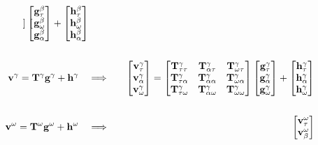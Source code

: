 \begin{equation}
\begin{aligned}
\begin{bmatrix}
    \end{bmatrix}
    \begin{bmatrix}
        \mathbf g^{\beta}_{\tau} \\
        \mathbf g^{\beta}_{\omega} \\
        \mathbf g^{\beta}_{\alpha} \\
    \end{bmatrix} + 
    \begin{bmatrix}
        \mathbf h^{\beta}_{\tau} \\
        \mathbf h^{\beta}_{\omega} \\
        \mathbf h^{\beta}_{\alpha}
    \end{bmatrix}\\
&& \\
\mathbf v^{\gamma} = \mathbf T^{\gamma} \mathbf g^{\gamma} + \mathbf h^{\gamma} \quad & \Longrightarrow  & \quad
    \begin{bmatrix}
        \mathbf v^{\gamma}_{\tau} \\
        \mathbf v^{\gamma}_{\alpha} \\
        \mathbf v^{\gamma}_{\omega} \\
    \end{bmatrix}
    =
    \begin{bmatrix}
        \mathbf T^{\gamma}_{\tau\tau}    & \mathbf T^{\gamma}_{\alpha\tau}   & \mathbf T^{\gamma}_{\omega\tau} \\
        \mathbf T^{\gamma}_{\tau\alpha}  & \mathbf T^{\gamma}_{\alpha\alpha} & \mathbf T^{\gamma}_{\omega\alpha} \\
        \mathbf T^{\gamma}_{\tau\omega}  & \mathbf T^{\gamma}_{\alpha\omega} & \mathbf T^{\gamma}_{\omega\omega} \\
    \end{bmatrix}
    \begin{bmatrix}
        \mathbf g^{\gamma}_{\tau} \\
        \mathbf g^{\gamma}_{\alpha} \\
        \mathbf g^{\gamma}_{\omega} \\
    \end{bmatrix} + 
    \begin{bmatrix}
        \mathbf h^{\gamma}_{\tau} \\
        \mathbf h^{\gamma}_{\alpha} \\
        \mathbf h^{\gamma}_{\omega} \\
    \end{bmatrix}\\    
&& \\    
\mathbf v^{\omega} = \mathbf T^{\omega} \mathbf g^{\omega} + \mathbf h^{\omega} \quad & \Longrightarrow  & \quad
    \begin{bmatrix}
        \mathbf v^{\omega}_{\tau} \\
        \mathbf v^{\omega}_{\beta} \\

\end{bmatrix}
\end{aligned}
\end{equation}
